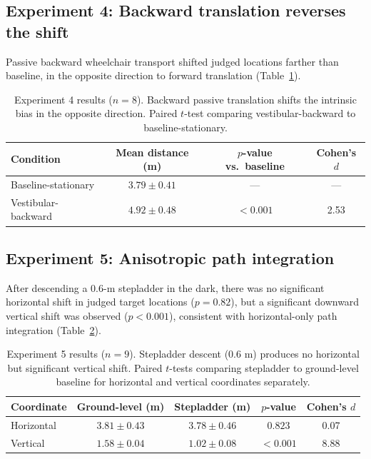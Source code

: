 \documentclass[11pt]{article}
\begin{document}
\subsection{Experiment 4: Backward translation reverses the shift}

Passive backward wheelchair transport shifted judged locations farther than baseline, in the opposite direction to forward translation (Table~\ref{tab:exp4}).

\begin{table}[H]
\centering
\caption{Experiment 4 results ($n = 8$). Backward passive translation shifts the intrinsic bias in the opposite direction. Paired $t$-test comparing vestibular-backward to baseline-stationary.}
\label{tab:exp4}
\begin{tabular}{lccc}
\toprule
\textbf{Condition} & \textbf{Mean distance (m)} & \textbf{$p$-value vs.\ baseline} & \textbf{Cohen's $d$} \\
\midrule
Baseline-stationary & $3.79 \pm 0.41$ & --- & --- \\
Vestibular-backward & $4.92 \pm 0.48$ & $< 0.001$ & 2.53 \\
\bottomrule
\end{tabular}
\end{table}

\subsection{Experiment 5: Anisotropic path integration}

After descending a 0.6-m stepladder in the dark, there was no significant horizontal shift in judged target locations ($p = 0.82$), but a significant downward vertical shift was observed ($p < 0.001$), consistent with horizontal-only path integration (Table~\ref{tab:exp5}).

\begin{table}[H]
\centering
\caption{Experiment 5 results ($n = 9$). Stepladder descent (0.6 m) produces no horizontal but significant vertical shift. Paired $t$-tests comparing stepladder to ground-level baseline for horizontal and vertical coordinates separately.}
\label{tab:exp5}
\begin{tabular}{lcccc}
\toprule
\textbf{Coordinate} & \textbf{Ground-level (m)} & \textbf{Stepladder (m)} & \textbf{$p$-value} & \textbf{Cohen's $d$} \\
\midrule
Horizontal & $3.81 \pm 0.43$ & $3.78 \pm 0.46$ & $0.823$ & 0.07 \\
Vertical & $1.58 \pm 0.04$ & $1.02 \pm 0.08$ & $< 0.001$ & 8.88 \\
\bottomrule
\end{tabular}
\end{table}
\end{document}
